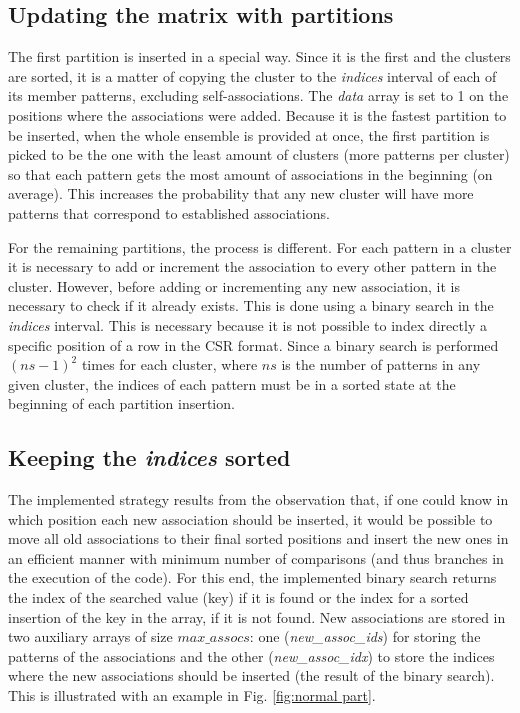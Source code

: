 \subsection{Updating the matrix with partitions}

\noindent The first partition is inserted in a special way.
Since it is the first and the clusters are sorted, it is a matter of copying the cluster to the \emph{indices} interval of each of its member patterns, excluding self-associations.
The \emph{data} array is set to 1 on the positions where the associations were added.
Because it is the fastest partition to be inserted, when the whole ensemble is provided at once, the first partition is picked to be the one with the least amount of clusters (more patterns per cluster) so that each pattern gets the most amount of associations in the beginning (on average).
This increases the probability that any new cluster will have more patterns that correspond to established associations.

For the remaining partitions, the process is different.
For each pattern in a cluster it is necessary to add or increment the association to every other pattern in the cluster.
However, before adding or incrementing any new association, it is necessary to check if it already exists.
This is done using a binary search in the \emph{indices} interval.
This is necessary because it is not possible to index directly a specific position of a row in the CSR format.
Since a binary search is performed $(ns - 1)^2$ times for each cluster, where $ns$ is the number of patterns in any given cluster, the indices of each pattern must be in a sorted state at the beginning of each partition insertion.

\subsection{Keeping the \emph{indices} sorted}

\noindent The implemented strategy results from the observation that, if one could know in which position each new association should be inserted, it would be possible to move all old associations to their final sorted positions and insert the new ones in an efficient manner with minimum number of comparisons (and thus branches in the execution of the code).
For this end, the implemented binary search returns the index of the searched value (key) if it is found or the index for a sorted insertion of the key in the array, if it is not found.
New associations are stored in two auxiliary arrays of size $max\_assocs$: one (\emph{new\_assoc\_ids}) for storing the patterns of the associations and the other (\emph{new\_assoc\_idx}) to store the indices where the new associations should be inserted (the result of the binary search).
This is illustrated with an example in Fig. \ref{fig:normal part}.

